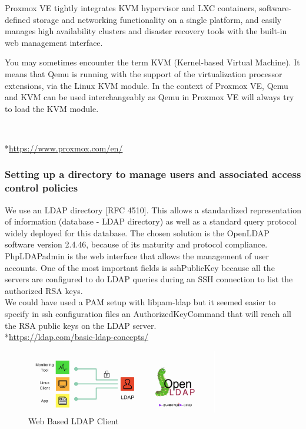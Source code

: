 \vspace{1cm}
Proxmox VE tightly integrates KVM hypervisor and LXC
containers, software-defined storage and networking functionality on a
single platform, and easily manages high availability clusters and
disaster recovery tools with the built-in web management interface.

\vspace{0.5cm}
You may sometimes encounter the term KVM (Kernel-based Virtual Machine).
It means that Qemu is running with the support of the virtualization
processor extensions, via the Linux KVM module. In the context of
Proxmox VE, Qemu and KVM can be used interchangeably as Qemu in Proxmox
VE will always try to load the KVM module.

\\
\vspace{1cm}

*\url{https://www.proxmox.com/en/}

\pagebreak

\subsubsection{Setting up a directory to manage users and associated access control policies}

\vspace{0.4cm}

We use an LDAP directory [RFC 4510].
This allows a standardized representation of information (database - LDAP directory) as well as a standard query protocol widely deployed for this database.
The chosen solution is the OpenLDAP software version 2.4.46, because of its
maturity and protocol compliance. PhpLDAPadmin is the web interface that
allows the management of user accounts. One of the most important fields is
sshPublicKey because all the servers are configured to do LDAP queries
during an SSH connection to list the authorized RSA keys.
\\ We could have used a PAM setup with libpam-ldap but it seemed easier to specify
in ssh configuration files an AuthorizedKeyCommand that will reach all the
RSA public keys on the LDAP server.
\\
*\url{https://ldap.com/basic-ldap-concepts/}

\begin{figure}[!h]
  \centering
  \includegraphics[width=0.75\textwidth]{images/ldap-example.png}
  \caption{Web Based LDAP Client}
  \label{LDAP}
\end{figure}

